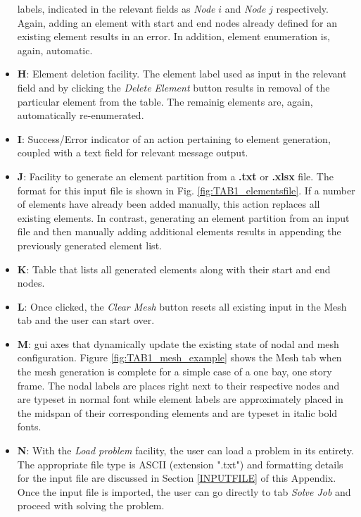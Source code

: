 \begin{appendices}
\begin{itemize}
	labels, indicated in the relevant fields as \textit{Node} $i$ and 
	\textit{Node} $j$ respectively. Again, adding an element with start and end 
	nodes already defined for an existing element results in an error. In 
	addition, element enumeration is, again, automatic.
	\item \textbf{H}: Element deletion facility. The element label used as 
	input in the relevant field and by clicking the \textit{Delete Element} 
	button results in removal of the particular element from the table. The 
	remainig elements are, again, automatically re-enumerated.
	\item \textbf{I}: Success/Error indicator of an action pertaining to 
	element generation, coupled with a text field for relevant message output.
	\item \textbf{J}: Facility to generate an element partition from a 
	\textbf{.txt} or \textbf{.xlsx} file. The format for this input file is 
	shown in Fig. \ref{fig:TAB1_elementsfile}. If a number of elements have 
	already been added manually, this action replaces all existing elements. In 
	contrast, generating an element partition from an input file and then 
	manually adding additional elements results in appending the previously 
	generated element list.
	\item \textbf{K}:  Table that lists all generated elements along with their 
	start and end nodes.
	\item \textbf{L}: Once clicked, the \textit{Clear Mesh} button resets all 
	existing input in the Mesh tab and the user can start over.
	\item \textbf{M}: \acrshort{gui} axes that dynamically update the existing 
	state of 
	nodal and mesh configuration. Figure \ref{fig:TAB1_mesh_example} shows the 
	Mesh tab when the mesh generation is complete for a simple case of a one 
	bay, one story frame. The nodal labels are places right next to their 
	respective nodes and are typeset in normal font while element labels are 
	approximately placed in the midspan of their corresponding elements and are 
	typeset in italic bold fonts.
	\item \textbf{N}: With the \textit{Load problem} facility, the user can 
	load a problem in its entirety. The appropriate file type is ASCII 
	(extension ".txt") and formatting details for the input file are discussed 
	in Section \ref{INPUTFILE} of this Appendix. Once the input file is 
	imported, the user 
	can go directly to tab \textit{Solve Job} and proceed with solving the 
	problem.
\end{itemize}


\end{appendices}

